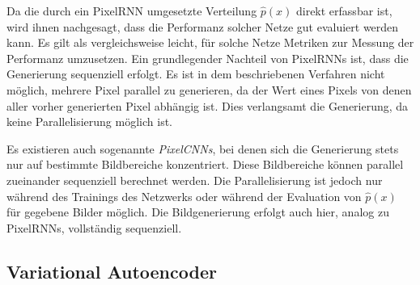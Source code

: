 Da die durch ein \ac{PixelRNN} umgesetzte Verteilung $\hat{p}(x)$ direkt erfassbar ist, wird ihnen nachgesagt, dass die Performanz solcher Netze gut evaluiert werden kann. Es gilt als vergleichsweise leicht, für solche Netze Metriken zur Messung der Performanz umzusetzen. Ein grundlegender Nachteil von \acp{PixelRNN} ist, dass die Generierung sequenziell erfolgt. Es ist in dem beschriebenen Verfahren nicht möglich, mehrere Pixel parallel zu generieren, da der Wert eines Pixels von denen aller vorher generierten Pixel abhängig ist. Dies verlangsamt die Generierung, da keine Parallelisierung möglich ist. \cite{generativeModelsSurvey}

Es existieren auch sogenannte \emph{PixelCNNs}, bei denen sich die Generierung stets nur auf bestimmte Bildbereiche konzentriert. Diese Bildbereiche können parallel zueinander sequenziell berechnet werden. Die Parallelisierung ist jedoch nur während des Trainings des Netzwerks oder während der Evaluation von $\hat{p}(x)$ für gegebene Bilder möglich. Die Bildgenerierung erfolgt auch hier, analog zu \acp{PixelRNN}, vollständig sequenziell. \cite{pixelRNN}

\subsection{Variational Autoencoder}




